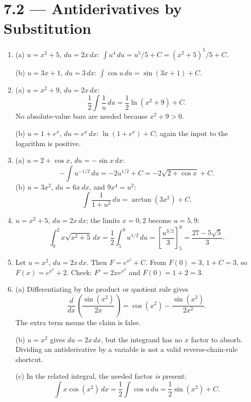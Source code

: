 \documentclass[11pt]{article}
\newcommand{\dx}{\,dx}
\newcommand{\topic}[2]{\clearpage\section*{#1 --- #2}}
\begin{document}
\topic{7.2}{Antiderivatives by Substitution}
\begin{enumerate}[itemsep=0.65em]
\item (a) $u=x^2+5$, $du=2x\,dx$:
$\int u^4\,du=u^5/5+C=\boxed{(x^2+5)^5/5+C}$.

(b) $u=3x+1$, $du=3\,dx$:
$\int\cos u\,du=\boxed{\sin(3x+1)+C}$.
\item (a) $u=x^2+9$, $du=2x\,dx$:
\[
\frac12\int\frac1u\,du=\boxed{\frac12\ln(x^2+9)+C}.
\]
No absolute-value bars are needed because $x^2+9>0$.

(b) $u=1+e^x$, $du=e^x\,dx$:
$\boxed{\ln(1+e^x)+C}$; again the input to the logarithm is positive.
\item (a) $u=2+\cos x$, $du=-\sin x\,dx$:
\[
-\int u^{-1/2}\,du=-2u^{1/2}+C
=\boxed{-2\sqrt{2+\cos x}+C}.
\]
(b) $u=3x^2$, $du=6x\,dx$, and $9x^4=u^2$:
\[
\int\frac{1}{1+u^2}\,du=\boxed{\arctan(3x^2)+C}.
\]
\item $u=x^2+5$, $du=2x\,dx$; the limits $x=0,2$ become $u=5,9$:
\[
\int_0^2x\sqrt{x^2+5}\dx
=\frac12\int_5^9u^{1/2}\,du
=\left[\frac{u^{3/2}}3\right]_5^9
=\boxed{\frac{27-5\sqrt5}{3}}.
\]
\item Let $u=x^2$, $du=2x\,dx$. Then $F=e^{x^2}+C$.
From $F(0)=3$, $1+C=3$, so $\boxed{F(x)=e^{x^2}+2}$.
Check: $F'=2xe^{x^2}$ and $F(0)=1+2=3$.
\item (a) Differentiating by the product or quotient rule gives
\[
\frac{d}{dx}\left(\frac{\sin(x^2)}{2x}\right)
=\cos(x^2)-\frac{\sin(x^2)}{2x^2}.
\]
The extra term means the claim is false.

(b) $u=x^2$ gives $du=2x\,dx$, but the integrand has no $x$ factor to absorb. Dividing an antiderivative by a variable is not a valid reverse-chain-rule shortcut.

(c) In the related integral, the needed factor \emph{is} present:
\[
\int x\cos(x^2)\dx=\frac12\int\cos u\,du
=\boxed{\frac12\sin(x^2)+C}.
\]
\end{enumerate}
\end{document}
